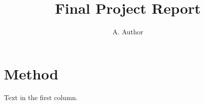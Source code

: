 \documentclass[twocolumn]{akizumi-note}
\title{Final Project Report}
\author{A. Author}
\begin{document}
\maketitle
\section{Method}
Text in the first column.
\end{document}
